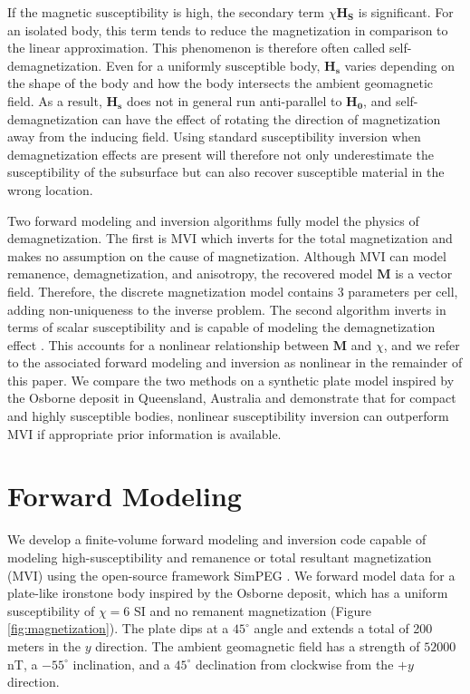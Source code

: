 \documentclass{segabs}
\begin{document}
If the magnetic susceptibility is high, the secondary term $\chi \mathbf{H_S}$ is significant. For an isolated body, this term tends to reduce the magnetization in comparison to the linear approximation. This phenomenon is therefore often called self-demagnetization.  Even for a uniformly susceptible body, $\mathbf{H_s}$ varies depending on the shape of the body and how the body intersects the ambient geomagnetic field.  As a result, $\mathbf{H_s}$ does not in general run anti-parallel to $\mathbf{H_0}$, and self-demagnetization can have the effect of rotating the direction of magnetization away from the inducing field. Using standard susceptibility inversion when demagnetization effects are present will therefore not only underestimate the susceptibility of the subsurface but can also recover susceptible material in the wrong location.

Two forward modeling and inversion algorithms fully model the physics of demagnetization. The first is MVI \citep{Lelievre2009} which inverts for the total magnetization and makes no assumption on the cause of magnetization. Although MVI can model remanence, demagnetization, and anisotropy, the recovered model $\mathbf{M}$ is a vector field. Therefore, the discrete magnetization model contains 3 parameters per cell, adding non-uniqueness to the inverse problem.  The second algorithm inverts in terms of scalar susceptibility and is capable of modeling the demagnetization effect \citep{Lelievre2006}.  This accounts for a  nonlinear relationship between $\mathbf{M}$ and $\chi$, and we refer to the associated forward modeling and inversion as nonlinear in the remainder of this paper. We compare the two methods on a synthetic plate model inspired by the Osborne deposit in Queensland, Australia and demonstrate that for compact and highly susceptible bodies, nonlinear susceptibility inversion can outperform MVI if appropriate prior information is available.

\vspace{-0.45cm}
\section{Forward Modeling}
\vspace{-0.25cm}

We develop a finite-volume forward modeling and inversion code capable of modeling high-susceptibility and remanence or total resultant magnetization (MVI) using the open-source framework SimPEG \citep{Cockett2015}. We forward model data for a plate-like ironstone body inspired by the Osborne deposit, which has a uniform susceptibility of $\chi=6$ SI and no remanent magnetization (Figure \ref{fig:magnetization}). The plate dips at a $45^{\circ}$ angle and extends a total of 200 meters in the $y$ direction.  The ambient geomagnetic field has a strength of $52000$nT, a $-55^{\circ}$ inclination, and a $45^{\circ}$ declination from clockwise from the $+y$ direction. 
\end{document}

